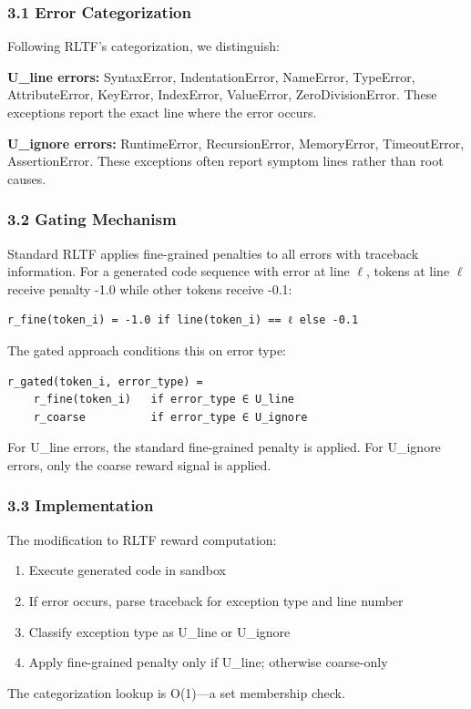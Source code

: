 
\subsubsection{3.1 Error Categorization}

Following RLTF's categorization, we distinguish:

\textbf{U\_line errors:} SyntaxError, IndentationError, NameError, TypeError, AttributeError, KeyError, IndexError, ValueError, ZeroDivisionError. These exceptions report the exact line where the error occurs.

\textbf{U\_ignore errors:} RuntimeError, RecursionError, MemoryError, TimeoutError, AssertionError. These exceptions often report symptom lines rather than root causes.

\subsubsection{3.2 Gating Mechanism}

Standard RLTF applies fine-grained penalties to all errors with traceback information. For a generated code sequence with error at line $\ell$, tokens at line $\ell$ receive penalty -1.0 while other tokens receive -0.1:

\begin{verbatim}
r_fine(token_i) = -1.0 if line(token_i) == ℓ else -0.1
\end{verbatim}

The gated approach conditions this on error type:

\begin{verbatim}
r_gated(token_i, error_type) = 
    r_fine(token_i)   if error_type ∈ U_line
    r_coarse          if error_type ∈ U_ignore
\end{verbatim}

For U\_line errors, the standard fine-grained penalty is applied. For U\_ignore errors, only the coarse reward signal is applied.

\subsubsection{3.3 Implementation}

The modification to RLTF reward computation:

\begin{enumerate}
\item Execute generated code in sandbox
\item If error occurs, parse traceback for exception type and line number
\item Classify exception type as U\_line or U\_ignore
\item Apply fine-grained penalty only if U\_line; otherwise coarse-only
\end{enumerate}

The categorization lookup is O(1)---a set membership check.

